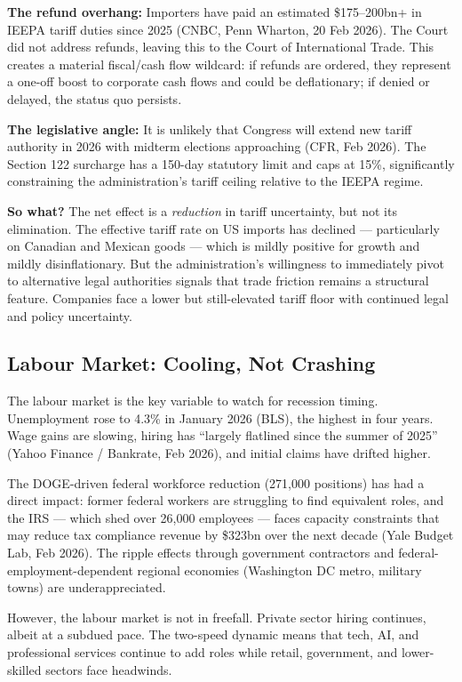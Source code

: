 \documentclass{wilson-report}
\begin{document}
\textbf{The refund overhang:} Importers have paid an estimated \$175--200bn+ in IEEPA tariff duties since 2025 (CNBC, Penn Wharton, 20 Feb 2026). The Court did not address refunds, leaving this to the Court of International Trade. This creates a material fiscal/cash flow wildcard: if refunds are ordered, they represent a one-off boost to corporate cash flows and could be deflationary; if denied or delayed, the status quo persists.

\textbf{The legislative angle:} It is unlikely that Congress will extend new tariff authority in 2026 with midterm elections approaching (CFR, Feb 2026). The Section 122 surcharge has a 150-day statutory limit and caps at 15\%, significantly constraining the administration's tariff ceiling relative to the IEEPA regime.

\textbf{So what?} The net effect is a \textit{reduction} in tariff uncertainty, but not its elimination. The effective tariff rate on US imports has declined --- particularly on Canadian and Mexican goods --- which is mildly positive for growth and mildly disinflationary. But the administration's willingness to immediately pivot to alternative legal authorities signals that trade friction remains a structural feature. Companies face a lower but still-elevated tariff floor with continued legal and policy uncertainty.

\subsection{Labour Market: Cooling, Not Crashing}

The labour market is the key variable to watch for recession timing. Unemployment rose to 4.3\% in January 2026 (BLS), the highest in four years. Wage gains are slowing, hiring has ``largely flatlined since the summer of 2025'' (Yahoo Finance / Bankrate, Feb 2026), and initial claims have drifted higher.

The DOGE-driven federal workforce reduction (271,000 positions) has had a direct impact: former federal workers are struggling to find equivalent roles, and the IRS --- which shed over 26,000 employees --- faces capacity constraints that may reduce tax compliance revenue by \$323bn over the next decade (Yale Budget Lab, Feb 2026). The ripple effects through government contractors and federal-employment-dependent regional economies (Washington DC metro, military towns) are underappreciated.

However, the labour market is not in freefall. Private sector hiring continues, albeit at a subdued pace. The two-speed dynamic means that tech, AI, and professional services continue to add roles while retail, government, and lower-skilled sectors face headwinds.
\end{document}
